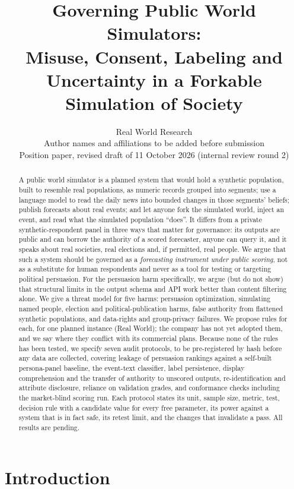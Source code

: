 \documentclass[11pt]{article}
\title{Governing Public World Simulators:\\Misuse, Consent, Labeling and Uncertainty in a Forkable Simulation of Society}
\author{Real World Research\\\small Author names and affiliations to be added before submission\\\small Position paper, revised draft of 11 October 2026 (internal review round 2)}
\date{}
\begin{document}
\maketitle

\begin{abstract}
A public world simulator is a planned system that would hold a synthetic population, built to resemble real populations, as numeric records grouped into segments; use a language model to read the daily news into bounded changes in those segments' beliefs; publish forecasts about real events; and let anyone fork the simulated world, inject an event, and read what the simulated population ``does''. It differs from a private synthetic-respondent panel in three ways that matter for governance: its outputs are public and can borrow the authority of a scored forecaster, anyone can query it, and it speaks about real societies, real elections and, if permitted, real people. We argue that such a system should be governed as a \emph{forecasting instrument under public scoring}, not as a substitute for human respondents and never as a tool for testing or targeting political persuasion. For the persuasion harm specifically, we argue (but do not show) that structural limits in the output schema and API work better than content filtering alone. We give a threat model for five harms: persuasion optimization, simulating named people, election and political-publication harms, false authority from flattened synthetic populations, and data-rights and group-privacy failures. We propose rules for each, for one planned instance (Real World); the company has not yet adopted them, and we say where they conflict with its commercial plans. Because none of the rules has been tested, we specify seven audit protocols, to be pre-registered by hash before any data are collected, covering leakage of persuasion rankings against a self-built persona-panel baseline, the event-text classifier, label persistence, display comprehension and the transfer of authority to unscored outputs, re-identification and attribute disclosure, reliance on validation grades, and conformance checks including the market-blind scoring run. Each protocol states its unit, sample size, metric, test, decision rule with a candidate value for every free parameter, its power against a system that is in fact safe, its retest limit, and the changes that invalidate a pass. All results are pending.
\end{abstract}

\section{Introduction}
\end{document}
